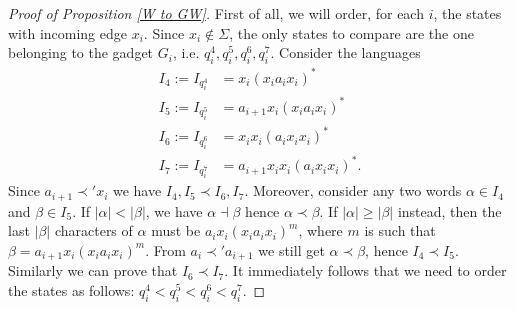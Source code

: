 \documentclass[runningheads]{llncs}
\begin{document}
\begin{proof}[\noindent Proof of Proposition \ref{W to GW}]
First of all, we will order, for each $i$, the states with incoming edge $x_i$. Since $x_i \notin \Sigma$, the only states to compare are the one belonging to the gadget $G_i$, i.e. $q_i^4, q_i^5, q_i^6, q_i^7$. Consider the languages
\begin{align*}
    I_4:=I_{q_{i}^4}&=x_i(x_ia_ix_i)^*\\
    I_5:=I_{q_{i}^5}&=a_{i+1}x_i(x_ia_ix_i)^*\\
    I_6:=I_{q_{i}^6}&=x_ix_i(a_ix_ix_i)^*\\
    I_7:=I_{q_{i}^7}&=a_{i+1}x_ix_i(a_ix_ix_i)^*.
\end{align*}
Since $a_{i+1}\prec'x_i$ we have $I_4,I_5 \prec I_6,I_7$. Moreover, consider any two words $\alpha \in I_4$ and $\beta \in I_5$. 
If $|\alpha|<|\beta|$, we have $\alpha \dashv \beta$ hence $\alpha \prec \beta$. If $|\alpha|\ge|\beta|$ instead, then the last $|\beta|$ characters of $\alpha$ must be $a_ix_i(x_ia_ix_i)^m$, where $m$ is such that $\beta=a_{i+1}x_i(x_ia_ix_i)^m$. 
From $a_i \prec ' a_{i+1}$ we still get $\alpha \prec \beta$, hence $I_4 \prec I_5$. Similarly we can prove that $I_6 \prec I_7$. It immediately follows that we need to order the states as follows: $q_i^4 < q_i^5 < q_i^6 < q_i^7$.


\end{proof}
\end{document}
